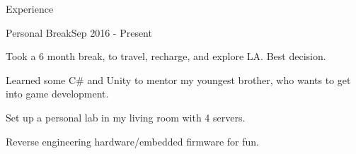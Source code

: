 \documentclass{resume} %
\begin{document}
\begin{rSection}{Experience}

\begin{rSubsection}{Personal Break}{Sep 2016 - Present}{}{}
\item Took a 6 month break, to travel, recharge, and explore LA. Best decision.
\item Learned some C\# and Unity to mentor my youngest brother, who wants to get into game development.
\item Set up a personal lab in my living room with 4 servers.
\item Reverse engineering hardware/embedded firmware for fun.
\end{rSubsection}



\end{rSection}
\end{document}
